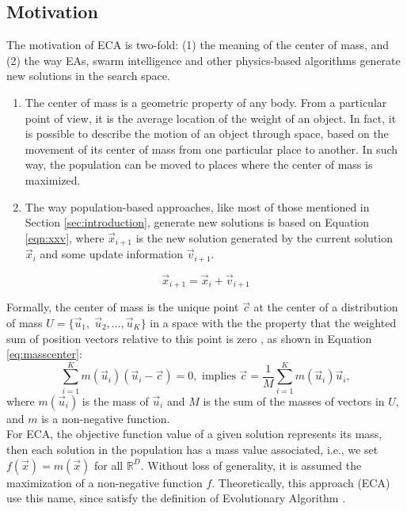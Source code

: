\documentclass[12pt,letterpape]{article}
\begin{document}
\subsection{Motivation} %
The motivation of ECA is two-fold: (1) the meaning of the center of mass, and (2) 
the way EAs, swarm intelligence and other physics-based algorithms generate new 
solutions in the search space. 
% 
\begin{enumerate}
	\item The center of mass is a geometric property of any body. From a particular 
		  point of view, it is the average location of the weight of an object. 
		  In fact, it is possible to describe the motion of an object through 
		  space, based on the movement of its center of mass from one particular 
		  place to another. In such way, the population can be moved to places 
		  where the center of mass is maximized. 
	\item The way population-based approaches, like most of those mentioned in 
		  Section \ref{sec:introduction}, generate new solutions is based on 
		  Equation \ref{eqn:xxv}, where $\vec{x}_{i + 1}$ is the new solution 
		  generated by the current solution $\vec{x}_{i}$ and some update 
		  information $\vec{v}_{i + 1}$. 
\end{enumerate}
\begin{equation}
	\vec{x}_{i + 1} = \vec{x}_{i} + \vec{v}_{i + 1}
	\label{eqn:xxv}
\end{equation}
% 

Formally, the center of mass is the unique point $\vec{c}$ at the center of a 
distribution of mass $U = \{\vec{u}_1,\; \vec{u}_2 , \ldots , \vec{u}_K \}$ in a 
space with the the property that the weighted sum of position vectors relative 
to this point is zero \cite{kleppner73,serway}, as shown in Equation \ref{eq:masscenter}:
%
%
\begin{equation}
	\sum_{i = 1}^K m(\vec{u}_i) (\vec{u}_i - \vec{c}) = 0, \text{ implies } 
	\vec{c} = \dfrac{1}{M} \sum_{i = 1}^K  m(\vec{u}_i)  \vec{u}_i,
	\label{eq:masscenter}
\end{equation}
%
%
where $m(\vec{u}_i)$ is the mass of $\vec{u}_i$ and  $M$ is the sum of the 
masses of vectors in $U$, and $m$ is a non-negative function.\\


For ECA, the objective function value of a given solution represents
its mass, then each solution in the population has a mass value associated,  i.e., 
we set $f(\vec{x}) = m(\vec{x})$ for all $\mathbb{R}^D$. Without loss of generality, 
it is assumed the maximization of a non-negative function $f$. 
Theoretically, this approach (ECA) use this name, since satisfy the definition of
Evolutionary Algorithm \cite{back}.
\end{document}
